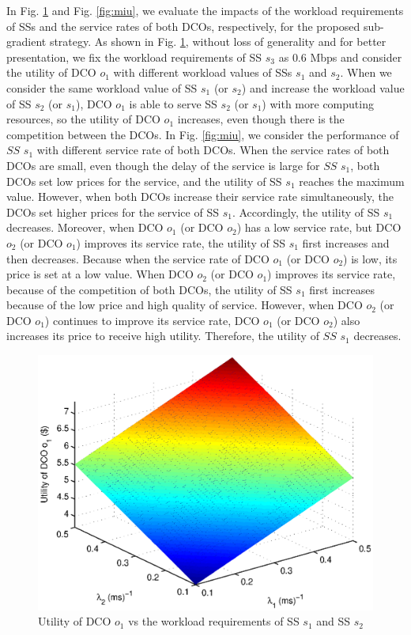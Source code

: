 \documentclass[twocolumn,10pt]{IEEEtran}
\begin{document}
In Fig. \ref{fig:lambda} and Fig. \ref{fig:miu}, we evaluate the impacts of the workload requirements of SSs and the service rates of both DCOs, respectively, for the proposed sub-gradient strategy. As shown in Fig. \ref{fig:lambda}, without loss of generality and for better presentation, we fix the workload requirements of SS $s_3$ as $0.6$ Mbps and consider the utility of DCO $o_1$ with different workload values of SSs $s_1$ and $s_2$. When we consider the same workload value of SS $s_1$ (or $s_2$) and increase the workload value of SS $s_2$ (or $s_1$), DCO $o_1$ is able to serve SS $s_2$ (or $s_1$) with more computing resources, so the utility of DCO $o_1$ increases, even though there is the competition between the DCOs. In Fig. \ref{fig:miu}, we consider the performance of $SS$ $s_1$ with different service rate of both DCOs. When the service rates of both DCOs are small, even though the delay of the service is large for $SS$ $s_1$, both DCOs set low prices for the service, and the utility of SS $s_1$ reaches the maximum value. However, when both DCOs increase their service rate simultaneously, the DCOs set higher prices for the service of SS $s_1$. Accordingly, the utility of SS $s_1$ decreases. Moreover, when DCO $o_1$ (or DCO $o_2$) has a low service rate, but DCO $o_2$ (or DCO $o_1$) improves its service rate, the utility of SS $s_1$ first increases and then decreases. Because when the service rate of DCO $o_1$ (or DCO $o_2$) is low, its price is set at a low value. When DCO $o_2$ (or DCO $o_1$) improves its service rate, because of the competition of both DCOs, the utility of SS $s_1$ first increases because of the low price and high quality of service. However, when DCO $o_2$ (or DCO $o_1$) continues to improve its service rate, DCO $o_1$ (or DCO $o_2$) also increases its price to receive high utility. Therefore, the utility of $SS$ $s_1$ decreases.



\begin{figure}[!t]
\centering
\includegraphics[scale=0.45, bb=490 265 95 564]{fig_lam_vs_dco.eps}
\caption{Utility of DCO $o_1$ vs the workload requirements of SS $s_1$ and SS $s_2$}
\label{fig:lambda}
\end{figure}
\end{document}
